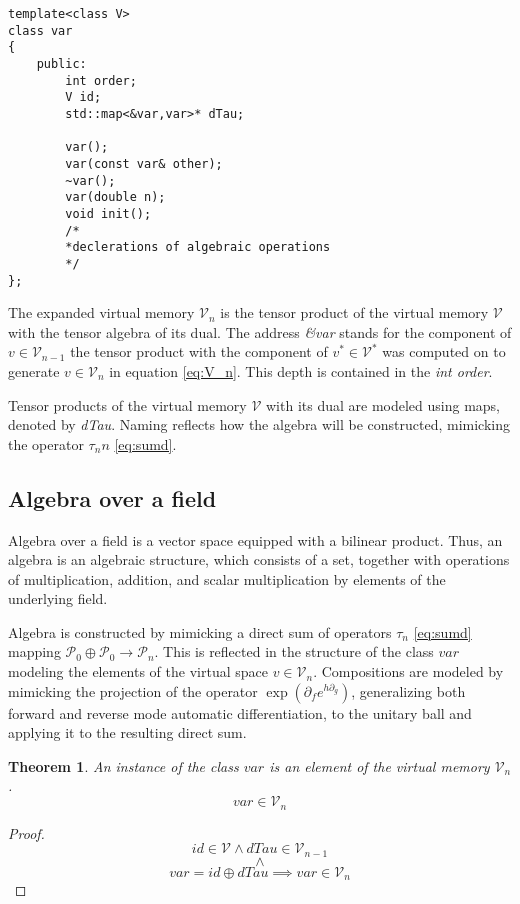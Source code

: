 \documentclass{article}
\newcommand{\VV}{\mathcal{V}}
\newcommand{\dP}{\mathcal{P}}
\newcommand{\D}{\partial}
\newcommand{\sumd}{\tau}
\newtheorem{izrek}{Theorem}[section]
\begin{document}
\begin{lstlisting}
template<class V>
class var
{
    public:
    	int order;
        V id;
        std::map<&var,var>* dTau;

        var();
        var(const var& other);
        ~var();
        var(double n);
        void init();
        /*
        *declerations of algebraic operations
        */
};
\end{lstlisting}

The expanded virtual memory $\VV_n$ is the tensor product of the virtual memory $\VV$ with the tensor algebra of its dual. The address \emph{\&var} stands for the component of $v\in\VV_{n-1}$ the tensor product with the component of $v^*\in\VV^*$ was computed on to generate $v\in\VV_n$ in equation \eqref{eq:V_n}. This depth is contained in the \emph{int order}.

Tensor products of the virtual memory $\VV$ with its dual are modeled using maps, denoted by \emph{dTau}. Naming reflects how the algebra will be constructed, mimicking the operator $\sumd_nn$ \eqref{eq:sumd}.

\subsection{Algebra over a field}

 Algebra over a field is a vector space equipped with a bilinear product. Thus, an algebra is an algebraic structure, which consists of a set, together with operations of multiplication, addition, and scalar multiplication by elements of the underlying field.
 
 Algebra is constructed by mimicking a direct sum of operators $\sumd_n$ \eqref{eq:sumd} mapping $\dP_0\oplus\dP_0\to\dP_n$. This is reflected in the structure of the class $var$  modeling the elements of the virtual space $v\in\VV_n$. Compositions are modeled by mimicking the projection of the operator $\exp(\D_fe^{h\D_g})$, generalizing both forward and reverse mode automatic differentiation, to the unitary ball and applying it to the resulting direct sum.
 
\begin{izrek}
An instance of the class $var$ is an element of the virtual memory $\VV_n$.
 \begin{equation}
 var\in\VV_n
 \end{equation}
\end{izrek}
\begin{proof}
\begin{equation}
 id\in \VV\land  dTau\in \VV_{n-1}
 \end{equation}
 $$\land$$
 \begin{equation}
 var=id\oplus dTau\implies var\in\VV_n
 \end{equation}


\end{proof}
\end{document}
